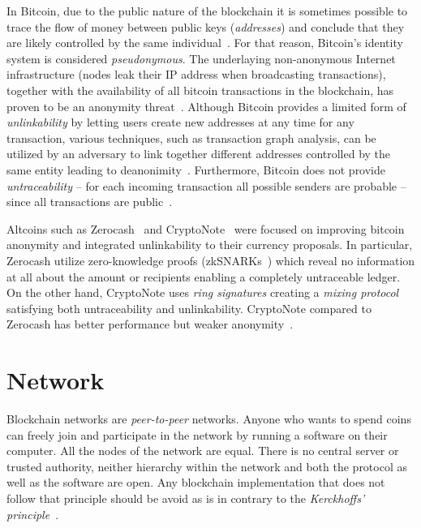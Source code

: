 In Bitcoin, due to the public nature of the blockchain it is sometimes possible to trace the flow of money between public keys (\textit{addresses}) and conclude that they are likely controlled by the same
individual~\cite{7163021,10.1007/978-3-319-17016-9_1}. For that reason, Bitcoin's identity system is considered \textit{pseudonymous}. The underlaying non-anonymous Internet infrastructure (nodes leak their IP address when broadcasting transactions),
together with the availability of all bitcoin transactions in the blockchain, has proven to be an anonymity threat~\cite{10.1007/978-3-319-17016-9_1, 7163021,Meiklejohn:2013:FBC:2504730.2504747,6113303,10.1007/978-3-642-39884-1_2,fi5020237}.
Although Bitcoin provides a limited form of \textit{unlinkability} by letting users create new addresses at any time for any transaction, various techniques, such as transaction graph analysis, can be utilized by an adversary to link together different addresses controlled
by the same entity leading to deanonimity~\cite{7163021,Meiklejohn:2013:FBC:2504730.2504747,6113303,10.1007/978-3-642-39884-1_2,fi5020237}. Furthermore, Bitcoin does not provide \textit{untraceability} -- for each incoming transaction all possible senders are probable -- since all transactions are public~\cite{cryptonote}.

Altcoins such as Zerocash~\cite{zcash} and CryptoNote~\cite{cryptonote} were focused on improving bitcoin anonymity and integrated unlinkability to their currency proposals. In particular, Zerocash utilize zero-knowledge proofs (zkSNARKs~\cite{10.1007/978-3-642-40084-1_6}) which reveal no information at all about the amount or recipients enabling a completely untraceable ledger. On the other hand, CryptoNote uses \textit{ring signatures} creating a \textit{mixing protocol} satisfying both untraceability and unlinkability. CryptoNote compared to Zerocash has better performance but weaker anonymity~\cite{7163021}.

\section{Network}\label{blockchain:network}

Blockchain networks are \textit{peer-to-peer} networks. Anyone who wants to spend coins can freely join and participate in the network by running a software on their computer. All the nodes of the network are equal. There is no central server or trusted authority, neither hierarchy within the network and both the protocol as well as the software are open. Any blockchain implementation that does not follow that principle should be avoid as is in contrary to the \textit{Kerckhoffs' principle}~\cite{kerckhoffs_principles}.

